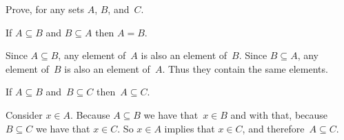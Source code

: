 \documentclass{test}  %
\begin{document}
\begin{problem}  \label{ex:PropertiesOfSubset}
Prove, for any sets $A$, $B$, and~$C$.
\begin{exes} 
\begin{exercise} 
  If $A\subseteq B$ and $B\subseteq A$ then $A=B$.
\end{exercise}  
\begin{answer}
   Since $A\subseteq B$, any element of~$A$ is also an element of~$B$.
   Since $B\subseteq A$, any element of~$B$ is also an element of~$A$.
   Thus they contain the same elements.  
\end{answer}
\begin{exercise} 
  If $A\subseteq B$ and~$B\subseteq C$ then~$A\subseteq C$.  
\end{exercise}
\begin{answer}
   Consider $x\in A$.
   Because $A\subseteq B$ we have that~$x\in B$ and with that, because
   $B\subseteq C$ we have that $x\in C$.
   So $x\in A$ implies that $x\in C$, and therefore~$A\subseteq C$.  
\end{answer}
\end{exes}
\end{problem}
\end{document}
